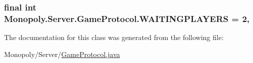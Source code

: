 \subsubsection[{\texorpdfstring{W\+A\+I\+T\+I\+N\+G\+P\+L\+A\+Y\+E\+RS}{WAITINGPLAYERS}}]{\setlength{\rightskip}{0pt plus 5cm}final int Monopoly.\+Server.\+Game\+Protocol.\+W\+A\+I\+T\+I\+N\+G\+P\+L\+A\+Y\+E\+RS = 2\hspace{0.3cm}{\ttfamily [static]}, {\ttfamily [private]}}\hypertarget{class_monopoly_1_1_server_1_1_game_protocol_aaefb144ef04b6626e85327e05d61e3b5}{}\label{class_monopoly_1_1_server_1_1_game_protocol_aaefb144ef04b6626e85327e05d61e3b5}


The documentation for this class was generated from the following file\+:\begin{DoxyCompactItemize}
\item 
Monopoly/\+Server/\hyperlink{_game_protocol_8java}{Game\+Protocol.\+java}\end{DoxyCompactItemize}
